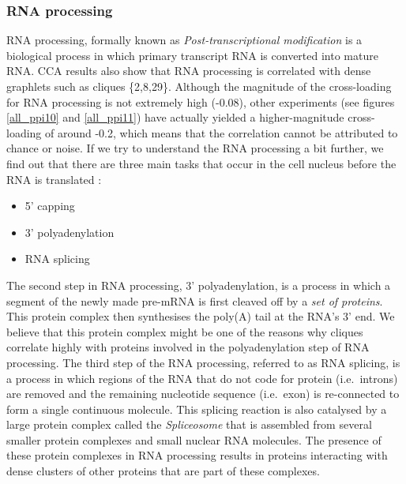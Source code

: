 \subsubsection{RNA processing}
RNA processing, formally known as \emph{Post-transcriptional modification} is a biological process in which primary transcript RNA is converted into mature RNA. CCA results also show that RNA processing is correlated with dense graphlets such as cliques \{2,8,29\}. Although the magnitude of the cross-loading for RNA processing is not extremely high (-0.08), other experiments (see figures \ref{all_ppi10} and \ref{all_ppi11}) have actually yielded a higher-magnitude cross-loading of around -0.2, which means that the correlation cannot be attributed to chance or noise. If we try to understand the RNA processing a bit further, we find out that there are three main tasks that occur in the cell nucleus before the RNA is translated \cite{berg2008bioquimica}:
\begin{itemize}
 \item 5' capping
 \item 3' polyadenylation
 \item RNA splicing
\end{itemize}

The second step in RNA processing, 3' polyadenylation, is a process in which a segment of the newly made pre-mRNA is first cleaved off by a \emph{set of proteins}. This protein complex then synthesises the poly(A) tail at the RNA's 3' end. We believe that this protein complex might be one of the reasons why cliques correlate highly with proteins involved in the polyadenylation step of RNA processing. The third step of the RNA processing, referred to as RNA splicing, is a process in which regions of the RNA that do not code for protein (i.e.\ introns) are removed and the remaining nucleotide sequence (i.e.\ exon) is re-connected to form a single continuous molecule. This splicing reaction is also catalysed by a large protein complex called the \emph{Spliceosome} that is assembled from several smaller protein complexes and small nuclear RNA molecules. The presence of these protein complexes in RNA processing results in proteins interacting with dense clusters of other proteins that are 
part of these complexes.

